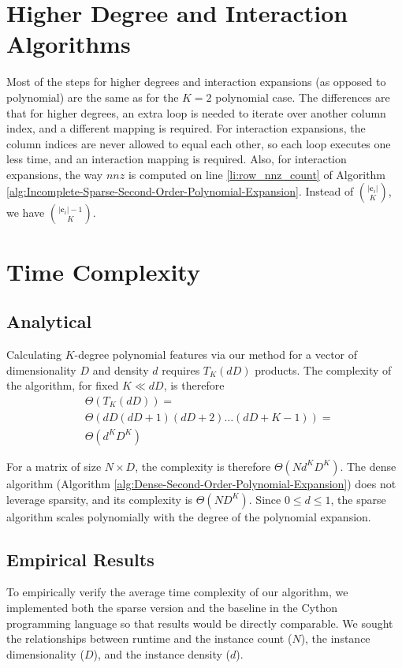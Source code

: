 \documentclass[journal]{journal}
\begin{document}
\section{Higher Degree and Interaction Algorithms}
Most of the steps for higher degrees and interaction expansions (as opposed to polynomial) are the same as for the $K=2$ polynomial case.
The differences are that for higher degrees, an extra loop is needed to iterate over another column index, and a different mapping is required.
For interaction expansions, the column indices are never allowed to equal each other, so each loop executes one less time, and an interaction mapping is required.
Also, for interaction expansions, the way $nnz$ is computed on line \ref{li:row_nnz_count} of Algorithm \ref{alg:Incomplete-Sparse-Second-Order-Polynomial-Expansion}.
Instead of $\binom{|\bm{c}_i|}{K}$, we have $\binom{|\bm{c}_i|-1}{K}$.

\section{Time Complexity}
\subsection{Analytical}
\label{sec:analytical}

Calculating $K$-degree polynomial features via our method for a vector of dimensionality $D$ and density $d$ requires $T_K(dD)$ products.
The complexity of the algorithm, for fixed $K \ll dD$, is therefore
\begin{align}
&\Theta\left(T_K(dD)\right) =\\
&\Theta\left(dD(dD+1)(dD+2)\dots(dD+K-1)\right) =\\
&\Theta\left(d^KD^K\right)
\end{align}

For a matrix of size $N \times D$, the complexity is therefore $\Theta\left(Nd^KD^K\right)$.
The dense algorithm (Algorithm \ref{alg:Dense-Second-Order-Polynomial-Expansion}) does not leverage sparsity, and its complexity is $\Theta\left(ND^K\right)$.
Since $0 \le d \le 1$, the sparse algorithm scales polynomially with the degree of the polynomial expansion.

\subsection{Empirical Results}
To empirically verify the average time complexity of our algorithm, we implemented both the sparse version and the baseline in the Cython programming language so that results would be directly comparable.
We sought the relationships between runtime and the instance count ($N$), the instance dimensionality ($D$), and the instance density ($d$).
\end{document}

